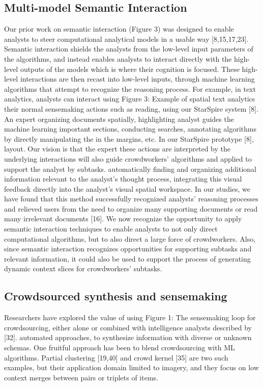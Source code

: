 \documentclass[journal]{vgtc}                %
\begin{document}
\subsection{Multi-model Semantic Interaction}
Our prior work on semantic interaction (Figure 3) was designed to enable analysts to steer computational analytical models in a usable way [8,15,17,23]. Semantic interaction shields the analysts from the low-level input parameters of the algorithms, and instead enables analysts to interact directly with the high-level outputs of the models which is where their cognition is focused. These high-level interactions are then recast into low-level inputs, through machine learning algorithms that attempt to recognize the reasoning process. For example, in text analytics, analysts can interact using Figure 3: Example of spatial text analytics their normal sensemaking actions such as reading, using our StarSpire system [8]. An expert organizing documents spatially, highlighting analyst guides the machine learning important sections, conducting searches, annotating algorithms by directly manipulating the in the margins, etc. In our StarSpire prototype [8], layout. Our vision is that the expert these actions are interpreted by the underlying interactions will also guide crowdworkers’ algorithms and applied to support the analyst by subtasks. automatically finding and organizing additional information relevant to the analyst’s thought process, integrating this visual feedback directly into the analyst’s visual spatial workspace. In our studies, we have found that this method successfully recognized analysts’ reasoning processes and relieved users from the need to organize many supporting documents or read many irrelevant documents [16]. We now recognize the opportunity to apply semantic interaction techniques to enable analysts to not only direct computational algorithms, but to also direct a large force of crowdworkers. Also, since semantic interaction recognizes opportunities for supporting subtasks and relevant information, it could also be used to support the process of generating dynamic context slices for crowdworkers’ subtasks.

\subsection{Crowdsourced synthesis and sensemaking}
Researchers have explored the value of using Figure 1: The sensemaking loop for crowdsourcing, either alone or combined with intelligence analysts described by [32]. automated approaches, to synthesize information with diverse or unknown schemas. One fruitful approach has been to blend crowdsourcing with ML algorithms. Partial clustering [19,40] and crowd kernel [35] are two such examples, but their application domain limited to imagery, and they focus on low context merges between pairs or triplets of items.
\end{document}

